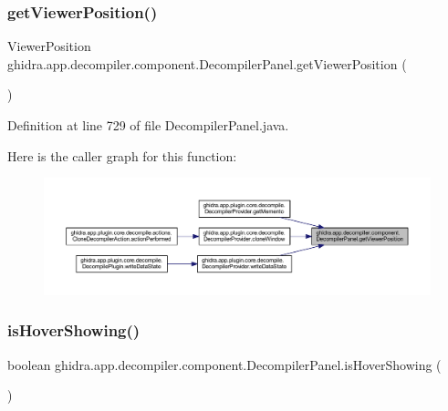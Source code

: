 \subsubsection{\texorpdfstring{getViewerPosition()}{getViewerPosition()}}
{\footnotesize\ttfamily Viewer\+Position ghidra.\+app.\+decompiler.\+component.\+Decompiler\+Panel.\+get\+Viewer\+Position (\begin{DoxyParamCaption}{ }\end{DoxyParamCaption})\hspace{0.3cm}{\ttfamily [inline]}}



Definition at line 729 of file Decompiler\+Panel.\+java.

Here is the caller graph for this function\+:
\nopagebreak
\begin{figure}[H]
\begin{center}
\leavevmode
\includegraphics[width=350pt]{classghidra_1_1app_1_1decompiler_1_1component_1_1_decompiler_panel_aa744d25092cfdb8870d8b8af7837bfcf_icgraph}
\end{center}
\end{figure}
\mbox{\label{classghidra_1_1app_1_1decompiler_1_1component_1_1_decompiler_panel_a88f183c3b2c4bb3860ad881c80f00027}} 
\subsubsection{\texorpdfstring{isHoverShowing()}{isHoverShowing()}}
{\footnotesize\ttfamily boolean ghidra.\+app.\+decompiler.\+component.\+Decompiler\+Panel.\+is\+Hover\+Showing (\begin{DoxyParamCaption}{ }\end{DoxyParamCaption})\hspace{0.3cm}{\ttfamily [inline]}}



